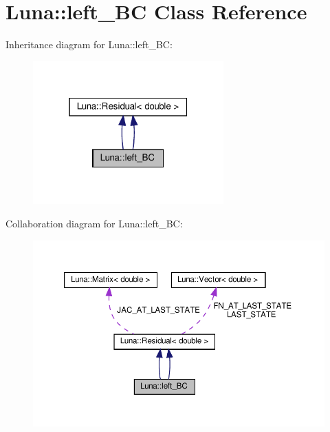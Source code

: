 \hypertarget{classLuna_1_1left__BC}{}\section{Luna\+:\+:left\+\_\+\+BC Class Reference}
\label{classLuna_1_1left__BC}


Inheritance diagram for Luna\+:\+:left\+\_\+\+BC\+:\nopagebreak
\begin{figure}[H]
\begin{center}
\leavevmode
\includegraphics[width=208pt]{classLuna_1_1left__BC__inherit__graph}
\end{center}
\end{figure}


Collaboration diagram for Luna\+:\+:left\+\_\+\+BC\+:\nopagebreak
\begin{figure}[H]
\begin{center}
\leavevmode
\includegraphics[width=350pt]{classLuna_1_1left__BC__coll__graph}
\end{center}
\end{figure}
